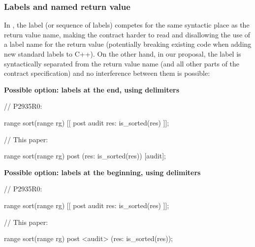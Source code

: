 \subsubsection{Labels and named return value}

In \cite{P2935R0}, the label (or sequence of labels) competes for the same syntactic place as the return value name, making the contract harder to read and disallowing the use of a label name for the return value (potentially breaking existing code when adding new standard labels to C++). On the other hand, in our proposal, the label is syntactically separated from the return value name (and all other parts of the contract specification) and no interference between them is possible:

\vspace{3mm}
\textbf{Possible option: labels at the end, using \tcode{[...]} delimiters}
\vspace{3mm}

\begin{minipage}{8cm}
\begin{codeblock}
// P2935R0:
  
range sort(range rg)
  [[ post audit res: is_sorted(res) ]];
\end{codeblock}
\end{minipage}
\begin{minipage}{8cm}
\begin{codeblock}
// This paper:
  
range sort(range rg)
  post (res: is_sorted(res)) [audit];
\end{codeblock}
\end{minipage}

\vspace{3mm}
\textbf{Possible option: labels at the beginning, using  delimiters}
\vspace{3mm}

\begin{minipage}{8cm}
\begin{codeblock}
// P2935R0:

range sort(range rg)
  [[ post audit res: is_sorted(res) ]];
\end{codeblock}
\end{minipage}
\begin{minipage}{8cm}
\begin{codeblock}
// This paper:
  
range sort(range rg)
  post <audit> (res: is_sorted(res));
\end{codeblock}
\end{minipage}

